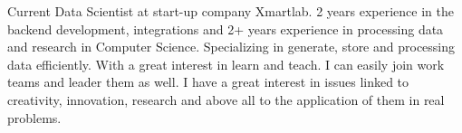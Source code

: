 

\begin{cvparagraph}

Current Data Scientist at start-up company Xmartlab. 2 years experience in the backend development, integrations and 2+ years experience in processing data and research in Computer Science. 
Specializing in generate, store and processing data efficiently. With a great interest in learn and teach. I can easily join work teams and leader them as well. I have a great interest in issues linked to creativity, innovation, research and above all to the application of them in real problems.
\end{cvparagraph}
